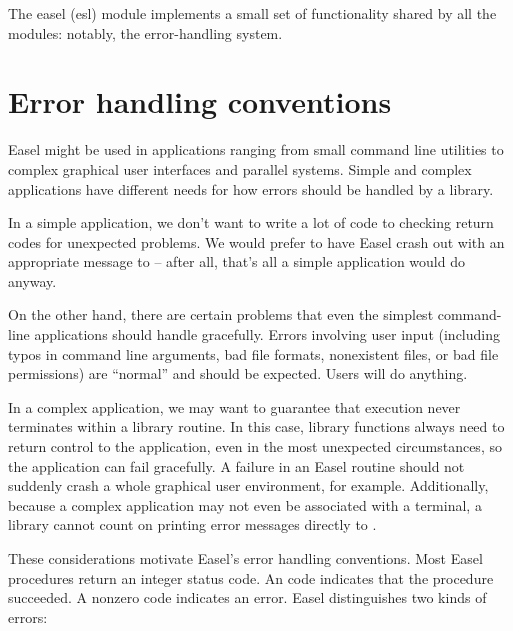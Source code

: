 The easel (esl) module implements a small set of functionality shared
by all the modules: notably, the error-handling system.

\section{Error handling conventions}

Easel might be used in applications ranging from small command line
utilities to complex graphical user interfaces and parallel
systems. Simple and complex applications have different needs for how
errors should be handled by a library.

In a simple application, we don't want to write a lot of code to
checking return codes for unexpected problems. We would prefer to have
Easel crash out with an appropriate message to  -- after
all, that's all a simple application would do anyway.

On the other hand, there are certain problems that even the simplest
command-line applications should handle gracefully. Errors involving
user input (including typos in command line arguments, bad file
formats, nonexistent files, or bad file permissions) are ``normal''
and should be expected. Users will do anything.

In a complex application, we may want to guarantee that execution
never terminates within a library routine. In this case, library
functions always need to return control to the application, even in
the most unexpected circumstances, so the application can fail
gracefully. A failure in an Easel routine should not suddenly crash a
whole graphical user environment, for example. Additionally, because a
complex application may not even be associated with a terminal, a
library cannot count on printing error messages directly to
.

These considerations motivate Easel's error handling conventions.
Most Easel procedures return an integer status code. An 
code indicates that the procedure succeeded. A nonzero code indicates
an error. Easel distinguishes two kinds of errors:

